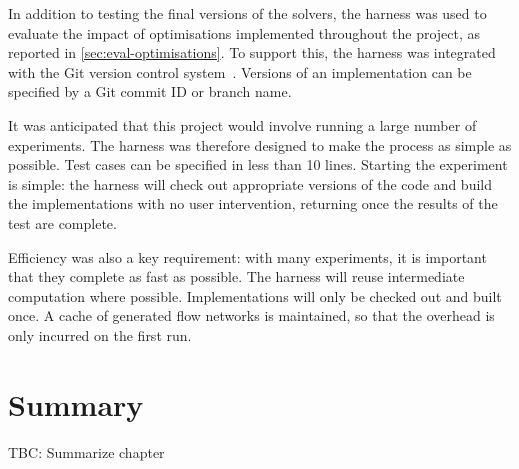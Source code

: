In addition to testing the final versions of the solvers, the harness was used to evaluate the impact of optimisations implemented throughout the project, as reported in \cref{sec:eval-optimisations}. To support this, the harness was integrated with the Git version control system~\cite{GitWWW}. Versions of an implementation can be specified by a Git commit ID or branch name.

It was anticipated that this project would involve running a large number of experiments. The harness was therefore designed to make the process as simple as possible. Test cases can be specified in less than 10 lines. Starting the experiment is simple: the harness will check out appropriate versions of the code and build the implementations with no user intervention, returning once the results of the test are complete.

Efficiency was also a key requirement: with many experiments, it is important that they complete as fast as possible. The harness will reuse intermediate computation where possible. Implementations will only be checked out and built once. A cache of generated flow networks is maintained\footnotemark, so that the overhead is only incurred on the first run.



\section{Summary}

TBC: Summarize chapter